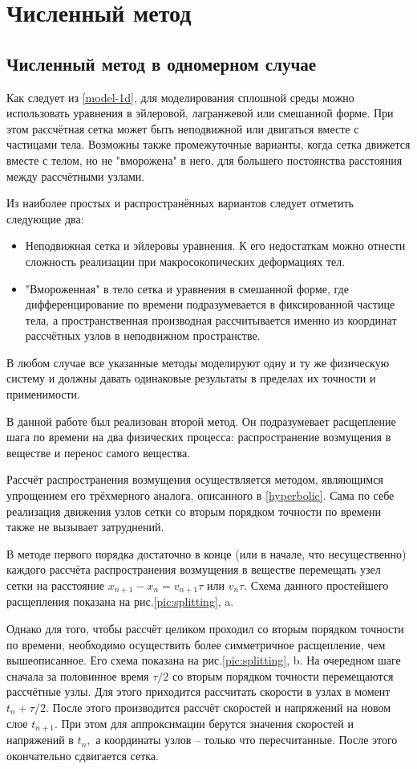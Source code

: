 \section{Численный метод}
\subsection{Численный метод в одномерном случае}
Как следует из \ref{model-1d}, для моделирования сплошной среды можно использовать уравнения в эйлеровой, лагранжевой или смешанной форме. При этом рассчётная сетка может быть неподвижной или двигаться вместе с частицами тела. Возможны также промежуточные варианты, когда сетка движется вместе с телом, но не "вморожена" в него, для большего постоянства расстояния между рассчётными узлами.

Из наиболее простых и распространённых вариантов следует отметить следующие два:
\begin{itemize}
\item Неподвижная сетка и эйлеровы уравнения. К его недостаткам можно отнести сложность реализации при макросокопических деформациях тел.
\item "Вмороженная" в тело сетка и уравнения в смешанной форме, где дифференцирование по времени подразумевается в фиксированной частице тела, а пространственная производная рассчитывается именно из координат рассчётных узлов в неподвижном пространстве.
\end{itemize}
В любом случае все указанные методы моделируют одну и ту же физическую систему и должны давать одинаковые результаты в пределах их точности и применимости. 

В данной работе был реализован второй метод. Он подразумевает расщепление шага по времени на два физических процесса: распространение возмущения в веществе и перенос самого вещества. 

Рассчёт распространения возмущения осуществляется методом, являющимся упрощением его трёхмерного аналога, описанного в \ref{hyperbolic}. Сама по себе реализация движения узлов сетки со вторым порядком точности по времени также не вызывает затруднений.

В методе первого порядка достаточно в конце (или в начале, что несущественно) каждого рассчёта распространения возмущения в веществе перемещать узел сетки на расстояние $x_{n+1} - x_{n} = v_{n+1}\tau$ или $v_{n}\tau$. Схема данного простейшего расщепления показана на рис.\ref{pic:splitting}, a.

Однако для того, чтобы рассчёт целиком проходил со вторым порядком точности по времени, необходимо осуществить более симметричное расщепление, чем вышеописанное. Его схема показана на рис.\ref{pic:splitting}, b. На очередном шаге сначала за половинное время $\tau/2$ со вторым порядком точности перемещаются рассчётные узлы. Для этого приходится рассчитать скорости в узлах в момент $t_n + \tau/2.$ После этого производится рассчёт скоростей и напряжений на новом слое $t_{n+1}$. При этом для аппроксимации берутся значения скоростей и напряжений в $t_n,$ а координаты узлов -- только что пересчитанные. После этого окончательно сдвигается сетка.

